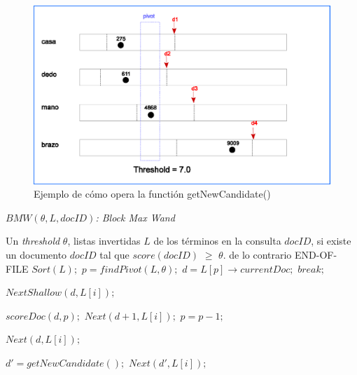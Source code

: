 \begin{figure}[!th]
\centering
\includegraphics[scale=.75]{images/get_new_candidate.eps}
\caption{Ejemplo de cómo opera la functión getNewCandidate()}
\label{fig:getNewCandidate}
\end{figure}%


\begin{algorithm}[!th]
\caption{\em $BMW(\theta, L, docID)$: Block Max Wand}
\label{alg:bmw}
\begin{algorithmic}[1]
\REQUIRE Un \textit{threshold} $\theta$, listas invertidas $L$ de los términos en la consulta
\ENSURE $docID$, si existe un documento $docID$ tal que $score(docID)$ $\geq$ $\theta$. de lo contrario END-OF-FILE
	\STATE $Sort(L);$
	\STATE $p = findPivot(L,\theta);$
	\STATE $d = L[p] \rightarrow currentDoc;$
  		\STATE $break;$
	\ENDIF
		
		\STATE $NextShallow(d, L[i]);$
	\ENDFOR
	
			\STATE $scoreDoc(d, p);$
				\STATE $Next(d + 1, L[i]);$
			\ENDFOR
		\ELSE
				\STATE $p = p - 1;$			
			\ENDWHILE
			
				\STATE $Next(d, L[i]);$
			\ENDFOR
			
		\ENDIF		
	\ELSE	
		\STATE $d' = getNewCandidate();$
			\STATE $Next(d', L[i]);$
		\ENDFOR
	\ENDIF
	
\ENDWHILE

\end{algorithmic}
\end{algorithm}

